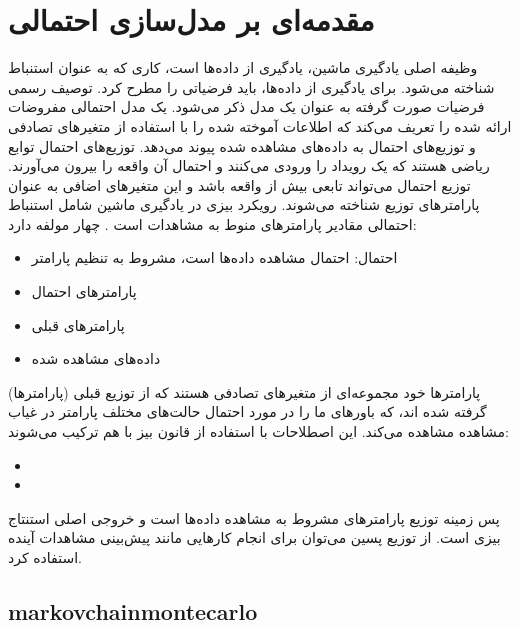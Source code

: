 \section{مقدمه‌ای بر مدل‌سازی احتمالی}

وظیفه اصلی یادگیری ماشین، یادگیری از داده‌ها است، کاری که به عنوان استنباط شناخته می‌شود. برای یادگیری از داده‌ها، باید فرضیاتی را مطرح کرد. توصیف رسمی فرضیات صورت گرفته به عنوان یک مدل ذکر می‌شود. یک مدل احتمالی مفروضات ارائه شده را تعریف می‌کند که اطلاعات آموخته شده را با استفاده از متغیرهای تصادفی و توزیع‌های احتمال به داده‌های مشاهده شده پیوند می‌دهد. توزیع‌های احتمال توابع ریاضی هستند که یک رویداد را ورودی می‌کنند و احتمال آن واقعه را بیرون می‌آورند. توزیع احتمال می‌تواند تابعی بیش از واقعه باشد و این متغیرهای اضافی به عنوان پارامترهای توزیع شناخته می‌شوند\cite{hanahan2000hallmarks}. 
رویکرد بیزی در یادگیری ماشین شامل استنباط احتمالی مقادیر پارامترهای منوط به مشاهدات است \cite{hanahan2011hallmarks}. چهار مولفه دارد:

\begin{itemize}
	\item 	احتمال: احتمال مشاهده داده‌ها است، مشروط به تنظیم پارامتر  
	\item 	پارامترهای احتمال
	\item	پارامترهای قبلی 
	\item داده‌های مشاهده شده
\end{itemize}
پارامترها خود مجموعه‌ای از متغیرهای تصادفی هستند که از توزیع قبلی  (پارامترها) گرفته شده اند، که باورهای ما را در مورد احتمال حالت‌های مختلف پارامتر در غیاب مشاهده مشاهده می‌کند. این اصطلاحات با استفاده از قانون بیز با هم ترکیب می‌شوند:
\begin{itemize}
	\item {}
	\item {}
\end{itemize}
پس زمینه توزیع پارامترهای مشروط به مشاهده داده‌ها است و خروجی اصلی استنتاج بیزی است. از توزیع پسین می‌توان برای انجام کارهایی مانند پیش‌بینی مشاهدات آینده استفاده کرد.


\subsection{\gls{markovchainmontecarlo}}

